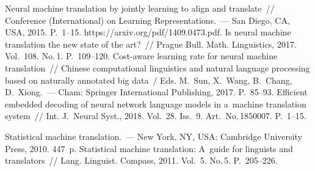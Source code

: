 \begin{multicols}{2}
 {\small\frenchspacing
 {%
 \begin{thebibliography}{99}
   Neural machine translation by jointly 
learning to align and translate~// Conference (International) on Learning 
Representations.~--- San Diego, CA, USA, 2015. P.~1--15. {\sf 
https://\linebreak arxiv.org/pdf/1409.0473.pdf}.
   Is 
neural machine translation the new state of the art?~// Prague Bull. 
Math. Linguistics, 2017. Vol.~108. No.\,1. P.~109--120.
   Cost-aware learning rate for neural 
machine translation~// Chinese computational linguistics and natural language 
processing based on naturally annotated big data~/ Eds. M.~Sun, X.~Wang, 
B.~Chang, D.~Xiong.~--- Cham: Springer International Publishing, 2017. P.~85--93.
   Efficient embedded decoding of 
neural network language models in a~machine translation system~// Int. 
J.~Neural Syst., 2018. Vol.~28. Iss.~9. Art.\ No.\,1850007. P.~1--15.
 
   Statistical machine translation.~--- New York, NY, USA: 
Cambridge University Press, 2010. 447~p.
   Statistical machine translation: A~guide for linguists 
and translators~// Lang. Linguist. Compass, 2011. Vol.~5. No.\,5. P.~205--226.


\end{thebibliography}}}
\end{multicols}

